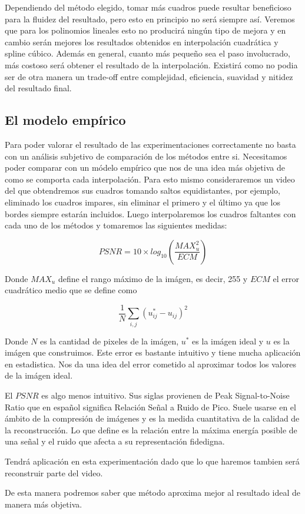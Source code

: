 Dependiendo del método elegido, tomar más cuadros puede resultar beneficioso para la fluidez del resultado, pero esto en principio no será siempre así. Veremos que para los polinomios lineales esto no producirá ningún tipo de mejora y en cambio serán mejores los resultados obtenidos en interpolación cuadrática y spline cúbico. Además en general, cuanto más pequeño sea el paso involucrado, más costoso será obtener el resultado de la interpolación. Existirá como no podia ser de otra manera un trade-off entre complejidad, eficiencia, suavidad y nitidez del resultado final. 
 
\subsection{El modelo empírico}

Para poder valorar el resultado de las experimentaciones correctamente no basta con un análisis subjetivo de comparación de los métodos entre si. Necesitamos poder comparar con un módelo empírico que nos de una idea más objetiva de como se comporta cada interpolación. Para esto mismo consideraremos un video del que obtendremos sus cuadros tomando saltos equidistantes, por ejemplo, eliminado los cuadros impares, sin eliminar el primero y el último ya que los bordes siempre estarán incluidos. Luego interpolaremos los cuadros faltantes con cada uno de los métodos y tomaremos las siguientes medidas:

\begin{equation}
	PSNR = 10 \times log_{10}(\dfrac{MAX_u^2}{ECM})
\end{equation}

Donde $MAX_u$ define el rango máximo de la imágen, es decir, 255 y $ECM$ el error cuadrático medio que se define como

\begin{equation}
	\dfrac{1}{N}\sum_{i,j}(u_{ij}^* - u_{ij})^2
\end{equation}

Donde $N$ es la cantidad de pixeles de la imágen, $u^*$ es la imágen ideal y $u$ es la imágen que construimos. Este error es bastante intuitivo y tiene mucha aplicación en estadistica. Nos da una idea del error cometido al aproximar todos los valores de la imágen ideal. 

El $PSNR$ es algo menos intuitivo. Sus siglas provienen de Peak Signal-to-Noise Ratio que en español significa Relación Señal a Ruido de Pico. Suele usarse en el ámbito de la compresión de imágenes y es la medida cuantitativa de la calidad de la reconstrucción. Lo que define es la relación entre la máxima energía posible de una señal y el ruido que afecta a su representación fidedigna. 

Tendrá aplicación en esta experimentación dado que lo que haremos tambien será reconstruir parte del video.

De esta manera podremos saber que método aproxima mejor al resultado ideal de manera más objetiva. 











